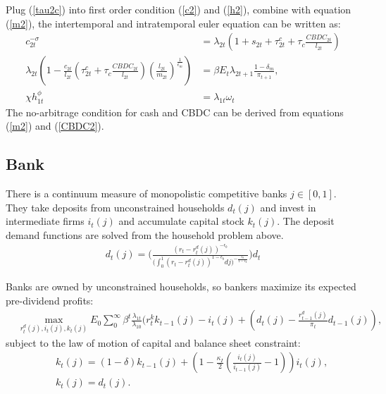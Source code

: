 \documentclass[12pt]{article}
\begin{document}
Plug (\ref{tau2c}) into first order condition (\ref{c2}) and  (\ref{h2}), combine with equation (\ref{m2}), the intertemporal and intratemporal euler equation can be written as: 
\begin{align*}
c_{2t}^{-\sigma} &= \lambda_{2t}(1+s_{2t}+\tau_{2t}^c+\tau_c\frac{CBDC_{2t}}{l_{2t}}) \\
\lambda_{2t}(1-\frac{c_{2t}}{l_{2t}}(\tau_{2t}^c+\tau_c\frac{CBDC_{2t}}{l_{2t}})(\frac{l_{2t}}{m_{2t}})^{\frac{1}{\epsilon_m}}) &= \beta E_t \lambda_{2t+1} \frac{1-\delta_m}{\pi_{t+1}}, \\
\chi h_{1t}^{\phi} &= \lambda_{1t}\omega_t 
\end{align*}
The no-arbitrage condition for cash and CBDC can be derived from equations (\ref{m2}) and (\ref{CBDC2}).

\subsection{Bank}
There is a continuum measure of monopolistic competitive banks $j \in [0,1]$. They take deposits from unconstrained households $d_{t}(j)$ and invest in intermediate firms $i_t(j)$ and accumulate capital stock $k_t(j)$. The deposit demand functions are solved from the household problem above. 
\begin{align*}
d_{t}(j) = \Biggl(\frac{(r_t-r_t^d(j))^{-\epsilon_b}}{\big(\int_0^1(r_t-r_t^d(j))^{1-\epsilon_b}dj\big)^{-\frac{\epsilon_b}{1-\epsilon_b}}}\Biggl)d_{t} 
\end{align*}

Banks are owned by unconstrained households, so bankers maximize its expected pre-dividend profits: 
\begin{align*}
 &\max_{r_t^d(j),i_t(j),k_t(j)}E_0 \sum_0^{\infty}\beta^t\frac{\lambda_{1t}}{\lambda_{10}}(r_t^kk_{t-1}(j)-i_t(j)+(d_{t}(j)-\frac{r_{t-1}^d(j)}{\pi_t}d_{t-1}(j)),
 \end{align*}
subject to the law of motion of capital and balance sheet constraint: 
 \begin{align*}
  \quad & k_t(j) = (1-\delta)k_{t-1}(j)+(1-\frac{\kappa_I}{2}(\frac{i_t(j)}{i_{t-1}(j)}-1))i_t(j), \\
& k_t(j) = d_{t}(j).
\end{align*}
\end{document}
